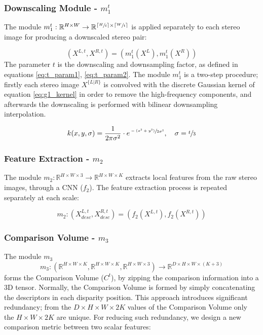 \documentclass[runningheads]{llncs}
\begin{document}
\subsubsection{Downscaling Module - $m_1^t$}

The module $m_1^t: \mathbb{R}^{H \times W} \rightarrow \mathbb{R}^{\lceil \sfrac{H}{t} \rceil \times \lceil \sfrac{W}{t} \rceil }$ is applied separately to each stereo image for producing a downscaled stereo pair:

\begin{equation} \label{eq:g1}
    (X^{L,t}, X^{R,t}) = (m_1^t(X^L), m_1^t(X^R))
\end{equation}{}
%
The parameter $t$ is the downscaling and downsampling factor, as defined in equations \ref{eq:t_param1}, \ref{eq:t_param2}. The module $m_1^t$ is a two-step procedure; firstly each stereo image $X^{\{L|R\}}$ is convolved with the discrete Gaussian kernel of equation \ref{eq:g1_kernel} in order to remove the high-frequency components, and afterwards the downscaling is performed with bilinear downsampling interpolation.

\begin{gather} \label{eq:g1_kernel}
    k(x, y, \sigma) = \frac{1}{2\pi\sigma^2} \cdot e^{\sfrac{-(x^2 + y^2)}{2\sigma^2}}, \quad \sigma = \sfrac{t}{3}
\end{gather}

\subsubsection{Feature Extraction - $m_2$}

The module $m_2: \mathbb{R}^{H \times W \times 3} \rightarrow \mathbb{R}^{H \times W \times K}$ extracts local features from the raw stereo images, through a CNN ($f_2$). The feature extraction process is repeated separately at each scale:

\begin{equation} \label{eq:f_1}
    m_2:(X^{L,t}_{desc}, X^{R,t}_{desc}) = (f_2(X^{L,t}), f_2(X^{R, t}))
\end{equation} 

\subsubsection{Comparison Volume - $m_3$} The module $m_3$
$$m_3:(\mathbb{R}^{H \times W \times K}, \mathbb{R}^{H \times W \times K}, \mathbb{R}^{H \times W \times 3}) \rightarrow \mathbb{R}^{D \times H \times W \times (K+3)}$$ forms the Comparison Volume ($C^t$), by zipping the comparison information into a 3D tensor. Normally, the Comparison Volume is formed by simply concatenating the descriptors in each disparity position. This approach introduces significant redundancy; from the $D \times H \times W \times 2K$ values of the Comparison Volume only the $H \times W \times 2K$ are unique. For reducing such redundancy, we design a new comparison metric between two scalar features:
\end{document}
